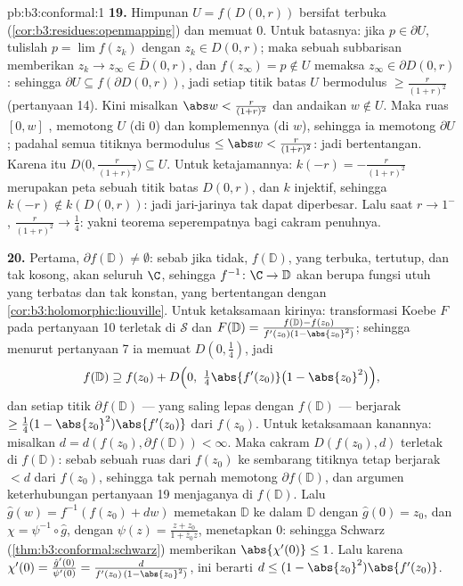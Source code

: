 \begin{solution}{pb:b3:conformal:1}
\textbf{19.} Himpunan $U = f(D(0, r))$ bersifat terbuka
(\cref{cor:b3:residues:openmapping}) dan memuat $0$.
Untuk batasnya: jika $p \in \partial U$, tulislah $p = \lim f(z_k)$
dengan $z_k \in D(0, r)$; maka sebuah subbarisan memberikan $z_k \to z_\infty
\in \bar D(0, r)$, dan $f(z_\infty) = p \notin U$ memaksa
$z_\infty \in \partial D(0, r)$: sehingga $\partial U \subseteq
f(\partial D(0, r))$, jadi setiap titik batas $U$ bermodulus
$\geq \frac r{(1+r)^2}$ (pertanyaan 14). Kini misalkan
$\abs w < \frac r{(1+r)^2}$ dan andaikan $w \notin U$. Maka
ruas $[0, w]$ , memotong $U$ (di $0$) dan
komplemennya (di $w$), sehingga ia memotong $\partial U$; padahal semua
titiknya bermodulus $\leq \abs w < \frac r{(1+r)^2}$:
jadi bertentangan. Karena itu $D\bigl(0, \frac r{(1+r)^2}\bigr)
\subseteq U$. Untuk ketajamannya: $k(-r) = -\frac r{(1+r)^2}$ merupakan
peta sebuah titik batas $D(0,r)$, dan $k$ injektif,
sehingga $k(-r) \notin k(D(0, r))$: jadi jari-jarinya tak dapat
diperbesar. Lalu saat $r \to 1^-$, $\frac r{(1+r)^2} \to \frac14$:
yakni teorema seperempatnya bagi cakram penuhnya.

\textbf{20.} Pertama, $\partial f(\mathbb D) \neq \emptyset$:
sebab jika tidak, $f(\mathbb D)$, yang terbuka, tertutup, dan tak kosong, akan
seluruh $\C$, sehingga $f^{-1} \colon \C \to \mathbb D$ akan berupa
fungsi utuh yang terbatas dan tak konstan, yang bertentangan dengan
\cref{cor:b3:holomorphic:liouville}. Untuk ketaksamaan kirinya:
transformasi Koebe $F$ pada pertanyaan 10 terletak di $\mathcal S$ dan
$F(\mathbb D) = \frac{f(\mathbb D) -
f(z_0)}{f'(z_0)(1-\abs{z_0}^2)}$; sehingga menurut pertanyaan 7 ia memuat
$D(0, \frac14)$, jadi
\[
f(\mathbb D) \supseteq f(z_0) + D\Bigl(0,\
\tfrac14\abs{f'(z_0)}\bigl(1 - \abs{z_0}^2\bigr)\Bigr) ,
\]
dan setiap titik $\partial f(\mathbb D)$ --- yang saling lepas dengan
\omterm{def:b3:topology:topology}{himpunan terbuka} $f(\mathbb D)$ --- berjarak $\geq
\frac14(1-\abs{z_0}^2)\abs{f'(z_0)}$ dari $f(z_0)$. Untuk ketaksamaan
kanannya: misalkan $d = d(f(z_0), \partial f(\mathbb D)) <
\infty$. Maka cakram $D(f(z_0), d)$ terletak di $f(\mathbb D)$: sebab
sebuah ruas dari $f(z_0)$ ke sembarang titiknya tetap berjarak
$< d$ dari $f(z_0)$, sehingga tak pernah memotong $\partial f(\mathbb D)$,
dan argumen keterhubungan pertanyaan 19 menjaganya di
$f(\mathbb D)$. Lalu $\hat g(w) = f^{-1}(f(z_0) + dw)$ memetakan
$\mathbb D$ ke dalam $\mathbb D$ dengan $\hat g(0) = z_0$, dan
$\chi = \psi^{-1}\circ\hat g$, dengan $\psi(z) = \frac{z +
z_0}{1 + \bar z_0z}$, menetapkan $0$: sehingga Schwarz
(\cref{thm:b3:conformal:schwarz}) memberikan $\abs{\chi'(0)}
\leq 1$. Lalu karena $\chi'(0) = \frac{\hat g'(0)}{\psi'(0)} =
\frac{d}{f'(z_0)\,(1 - \abs{z_0}^2)}$, ini berarti $d \leq (1 -
\abs{z_0}^2)\abs{f'(z_0)}$.


\end{solution}
